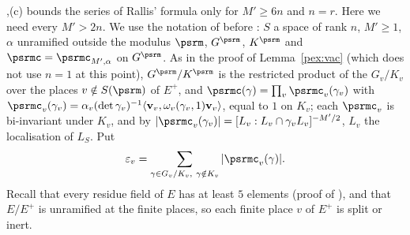 \documentclass[10pt]{amsart}
\theoremstyle{definition}
\theoremstyle{remark}
\providecommand{\psvac}{\mathbf v}
\begin{document}
{\cite[Lemma~2.11(b)]{P53}},(c) bounds the series of Rallis' formula only for $M'\ge6n$ and $n=r$.
Here we need every $M'>2n$. We use the notation of {\cite[\S2.3]{P53}} before {\cite[Lemma~2.11]{P53}}:
$S$ a space of rank $n$, $M'\ge1$, $\alpha$ unramified outside the modulus $\psrm$, $G^\psrm$, $K^\psrm$
and $\psrmc=\psrmc_{M',\alpha}$ on $G^\psrm$. As in the proof of Lemma~\ref{pex:vac} (which does not
use $n=1$ at this point), $G^\psrm/K^\psrm$ is the restricted product of the $G_v/K_v$ over the places
$v\notin S(\psrm)$ of $E^+$, and $\psrmc(\gamma)=\prod_v\psrmc_v(\gamma_v)$ with
$\psrmc_v(\gamma_v)=\alpha_v(\det\gamma_v)^{-1}\langle\psvac_v,\omega_v(\gamma_v,1)\psvac_v\rangle$, equal to
$1$ on $K_v$; each $\psrmc_v$ is bi-invariant under $K_v$, and by {\cite[Lemma~2.11(a)]{P53}}
$|\psrmc_v(\gamma_v)|=[L_v:L_v\cap\gamma_vL_v]^{-M'/2}$, $L_v$ the localisation of $L_S$. Put
\[
\varepsilon_v=\sum_{\gamma\in G_v/K_v,\ \gamma\notin K_v}|\psrmc_v(\gamma)| .
\]
Recall that every residue field of $E$ has at least $5$ elements (proof of {\cite[Lemma~2.11(b)]{P53}}),
and that $E/E^+$ is unramified at the finite places, so each finite place $v$ of $E^+$ is split or
inert.
\end{document}
